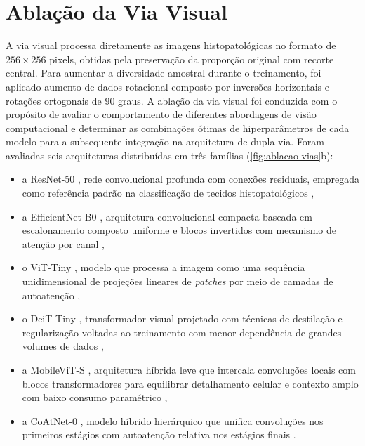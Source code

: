 \section{Ablação da Via Visual}
\label{sec:ablacao-visual}

A via visual processa diretamente as imagens histopatológicas no formato de $256 \times 256$ pixels, obtidas pela preservação da proporção original com recorte central. Para aumentar a diversidade amostral durante o treinamento, foi aplicado aumento de dados rotacional composto por inversões horizontais e rotações ortogonais de 90 graus. A ablação da via visual foi conduzida com o propósito de avaliar o comportamento de diferentes abordagens de visão computacional e determinar as combinações ótimas de hiperparâmetros de cada modelo para a subsequente integração na arquitetura de dupla via. Foram avaliadas seis arquiteturas distribuídas em três famílias (\ref{fig:ablacao-vias}b):

\begin{itemize}
    \item a ResNet-50 \cite{he2016deep}, rede convolucional profunda com conexões residuais, empregada como referência padrão na classificação de tecidos histopatológicos \cite{litjens2017survey,histImgColorectal},
    \item a EfficientNet-B0 \cite{tan2019efficientnet}, arquitetura convolucional compacta baseada em escalonamento composto uniforme e blocos invertidos com mecanismo de atenção por canal \cite{kushwah2026evcnet,yousaf2024twostream},
    \item o ViT-Tiny \cite{dosovitskiy2020image}, modelo que processa a imagem como uma sequência unidimensional de projeções lineares de \textit{patches} por meio de camadas de autoatenção \cite{shamshad2023transformers,clinicalReview},
    \item o DeiT-Tiny \cite{touvron2021training}, transformador visual projetado com técnicas de destilação e regularização voltadas ao treinamento com menor dependência de grandes volumes de dados \cite{oliveira2025hybrid},
    \item a MobileViT-S \cite{mehta2022mobilevit}, arquitetura híbrida leve que intercala convoluções locais com blocos transformadores para equilibrar detalhamento celular e contexto amplo com baixo consumo paramétrico \cite{kabir2025semobilevit,ding2023himvit},
    \item a CoAtNet-0 \cite{dai2021coatnet}, modelo híbrido hierárquico que unifica convoluções nos primeiros estágios com autoatenção relativa nos estágios finais \cite{oliveira2025hybrid,zaidkilani2025dualstream}.
\end{itemize}

